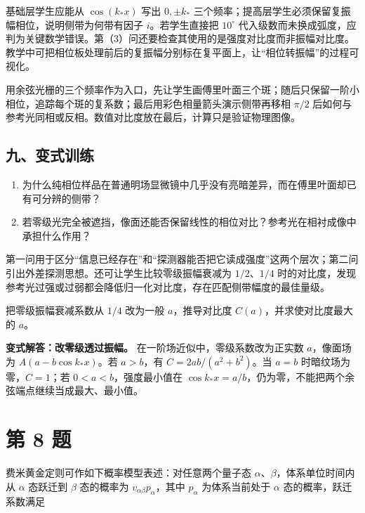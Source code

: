 \documentclass[12pt,a4paper,UTF8]{ctexart}
\newcommand{\tightlist}{\setlength{\itemsep}{0pt}\setlength{\parskip}{0pt}}
\begin{document}
基础层学生应能从 \(\cos(k_*x)\) 写出 \(0,\pm k_*\)
三个频率；提高层学生必须保留复振幅相位，说明侧带为何带有因子
\(i\)。若学生直接把 \(10^\circ\)
代入级数而未换成弧度，应判为关键数学错误。第（3）问还要检查其使用的是强度对比度而非振幅对比度。教学中可把相位板处理前后的复振幅分别标在复平面上，让``相位转振幅''的过程可视化。

用余弦光栅的三个频率作为入口，先让学生画傅里叶面三个斑；随后只保留一阶小相位，追踪每个斑的复系数；最后用彩色相量箭头演示侧带再移相
\(\pi/2\)
后如何与参考光同相或反相。数值对比度放在最后，计算只是验证物理图像。

\subsection{九、变式训练}\label{ux4e5dux53d8ux5f0fux8badux7ec3-6}

\begin{enumerate}
\def\labelenumi{\arabic{enumi}.}
\tightlist
\item
  为什么纯相位样品在普通明场显微镜中几乎没有亮暗差异，而在傅里叶面却已有可分辨的侧带？
\item
  若零级光完全被遮挡，像面还能否保留线性的相位对比？参考光在相衬成像中承担什么作用？
\end{enumerate}

第一问用于区分``信息已经存在''和``探测器能否把它读成强度''这两个层次；第二问引出外差探测思想。还可让学生比较零级振幅衰减为
\(1/2\)、\(1/4\)
时的对比度，发现参考光过强或过弱都会降低归一化对比度，存在匹配侧带幅度的最佳量级。

把零级振幅衰减系数从 \(1/4\) 改为一般 \(a\)，推导对比度
\(C(a)\)，并求使对比度最大的 \(a\)。

\textbf{变式解答：改零级透过振幅。} 在一阶场近似中，零级系数改为正实数
\(a\)，像面场为 \(A(a-b\cos k_*x)\)。若 \(a>b\)，有
\(C=2ab/(a^2+b^2)\)。当 \(a=b\) 时暗纹场为零，\(C=1\)；若
\(0<a<b\)，强度最小值在
\(\cos k_*x=a/b\)，仍为零，不能把两个余弦端点继续当成最大、最小值。

\newpage

\section{第 8 题}\label{ux7b2c-8-ux9898}

费米黄金定则可作如下概率模型表述：对任意两个量子态
\(\alpha\)、\(\beta\)，体系单位时间内从 \(\alpha\) 态跃迁到 \(\beta\)
态的概率为 \(v_{\alpha\beta}p_\alpha\)，其中 \(p_\alpha\) 为体系当前处于
\(\alpha\) 态的概率，跃迁系数满足
\end{document}
